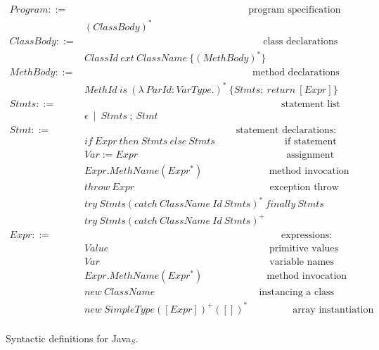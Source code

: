 \documentclass[tese,capa,english]{texufpel}
\begin{document}
\begin{figure}[!htb]
\[
\begin{array}{ll}
  Program ::= & \hspace{200pt} \textrm{program specification} \\
        & (ClassBody)^{*} \\
  ClassBody ::= & \hspace{218pt} \textrm{class declarations} \\
        & ClassId \ ext \ ClassName \ \{ (MethBody)^{*} \} \\
  MethBody ::= & \hspace{205pt} \textrm{method declarations} \\
        & MethId \ is \ ( \lambda \ ParId: VarType.)^{*} \ \{ Stmts; \ return \ [Expr] \} \\
  Stmts ::= & \hspace{240pt} \textrm{statement list} \\
        & \epsilon \ \mid \ Stmts \ ; \ Stmt  \\
  Stmt ::= & \hspace{185pt} \textrm{statement declarations:} \\
        & if \ Expr \ then \ Stmts \ else \ Stmts \hspace{85pt} \textrm{if statement} \\
        & Var := Expr \hspace{181pt} \textrm{assignment} \\  
        & Expr.MethName(Expr^{*}) \hspace{81pt} \textrm{method invocation} \\
        & throw \ Expr \hspace{165pt} \textrm{exception throw} \\
        & try \ Stmts(catch \ ClassName \ Id \ Stmts)^{*} \ finally \ Stmts \\
        & try \ Stmts(catch \ ClassName \ Id \ Stmts)^{+} \\
  Expr ::= & \hspace{240pt} \textrm{expressions: } \\
        & Value \hspace{196pt}\textrm{primitive values} \\
        & Var \hspace{207pt} \textrm{variable names} \\
        & Expr.MethName(Expr^{*}) \hspace{78pt} \textrm{method invocation} \\
        & new \ ClassName \hspace{127pt} \textrm{instancing a class} \\
        & new \ SimpleType([Expr])^{+}([])^{*} \hspace{55pt} \textrm{array instantiation} \\
\end{array}
\]
\vspace{-2ex}
\caption{Syntactic definitions for Java$_S$.}
\label{fig:js-syntax}
\end{figure}
\end{document}
